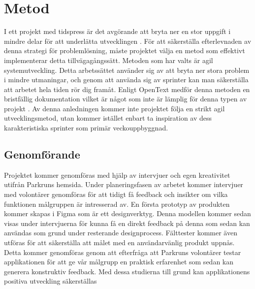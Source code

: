 \section{Metod}





I ett projekt med tidspress är det avgörande att bryta ner en stor uppgift i mindre delar för att underlätta utvecklingen \cite{agile}. För att säkerställa efterlevnaden av denna strategi för problemlösning, måste projektet välja en metod som effektivt implementerar detta tillvägagångssätt. Metoden som har valts är agil systemutveckling. Detta arbetssättet använder sig av att bryta ner stora problem i mindre utmaningar, och genom att använda sig av sprinter kan man säkerställa att arbetet hela tiden rör dig framåt. Enligt OpenText medför denna metoden en bristfällig dokumentation vilket är något som inte är lämplig för denna typen av projekt \cite{agile}.  Av denna anledningen kommer inte projektet följa en strikt agil utvecklingsmetod, utan kommer istället enbart ta inspiration av dess karakteristiska sprinter som primär veckouppbyggnad.

\subsection{Genomförande}

Projektet kommer genomföras med hjälp av intervjuer och egen kreativitet utifrån Parkruns hemsida. Under planeringsfasen av arbetet kommer intervjuer med volontärer genomföras för att tidigt få feedback och insikter om vilka funktionen målgruppen är intresserad av. En första prototyp av produkten kommer skapas i Figma som är ett designverktyg. Denna modellen kommer sedan visas under intervjuerna för kunna få en direkt feedback på denna som sedan kan användas som grund under resterande designprocess. Fälttester kommer även utföras för att säkerställa att målet med en användarvänlig produkt uppnås. Detta kommer genomföras genom att efterfråga att Parkruns volontärer testar applikationen för att ge vår målgrupp en praktisk erfarenhet som sedan kan generera konstruktiv feedback. Med dessa studierna till grund kan applikationens positiva utveckling säkerställas\\

